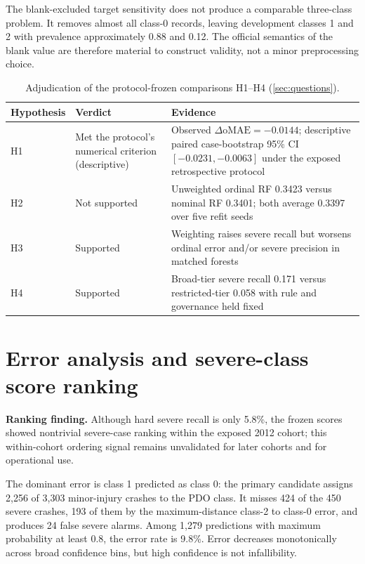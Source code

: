 \documentclass[11pt,letterpaper]{article}
\newcommand{\om}{\mathrm{oMAE}}
\newcommand{\CI}{95\% CI}
\begin{document}
The blank-excluded target sensitivity does not produce a comparable three-class problem. It removes almost all class-0 records, leaving development classes 1 and 2 with prevalence approximately 0.88 and 0.12. The official semantics of the blank value are therefore material to construct validity, not a minor preprocessing choice.

\begin{table}[htbp]
\centering
\caption{Adjudication of the protocol-frozen comparisons H1--H4 (\cref{sec:questions}).}
\label{tab:hypotheses}
\begin{tabularx}{\textwidth}{@{}L{0.11\textwidth}L{0.24\textwidth}Y@{}}
\toprule
\textbf{Hypothesis} & \textbf{Verdict} & \textbf{Evidence} \\
\midrule
H1 & Met the protocol's numerical criterion (descriptive) & Observed $\Delta\om=-0.0144$; descriptive paired case-bootstrap \CI{} $[-0.0231,-0.0063]$ under the exposed retrospective protocol \\
H2 & Not supported & Unweighted ordinal RF 0.3423 versus nominal RF 0.3401; both average 0.3397 over five refit seeds \\
H3 & Supported & Weighting raises severe recall but worsens ordinal error and/or severe precision in matched forests \\
H4 & Supported & Broad-tier severe recall 0.171 versus restricted-tier 0.058 with rule and governance held fixed \\
\bottomrule
\end{tabularx}
\end{table}

\section{Error analysis and severe-class score ranking}
\label{sec:ranking}
\textbf{Ranking finding.} Although hard severe recall is only 5.8\%, the frozen scores showed nontrivial severe-case ranking within the exposed 2012 cohort; this within-cohort ordering signal remains unvalidated for later cohorts and for operational use.

The dominant error is class 1 predicted as class 0: the primary candidate assigns 2,256 of 3,303 minor-injury crashes to the PDO class. It misses 424 of the 450 severe crashes, 193 of them by the maximum-distance class-2 to class-0 error, and produces 24 false severe alarms. Among 1,279 predictions with maximum probability at least 0.8, the error rate is 9.8\%. Error decreases monotonically across broad confidence bins, but high confidence is not infallibility.
\end{document}
